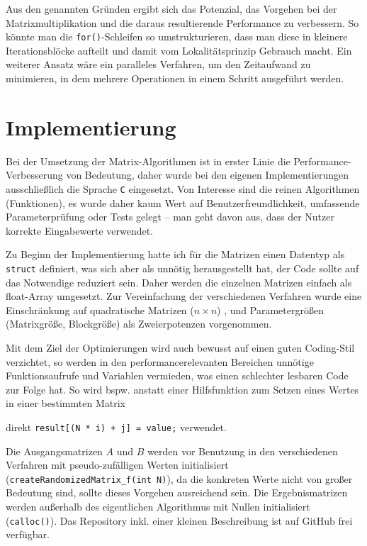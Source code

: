 \documentclass[a4paper,11pt]{scrartcl}
\newcommand{\bspw}{\mbox{bspw.}\xspace}
\newcommand{\inkl}{\mbox{inkl.}\xspace}
\begin{document}
Aus den genannten Gründen ergibt sich das Potenzial, das Vorgehen bei der Matrixmultiplikation
und die daraus resultierende Performance zu verbessern. So könnte man die \texttt{for()}-Schleifen so umstrukturieren, dass man diese in kleinere
Iterationsblöcke aufteilt und damit vom Lokalitätsprinzip Gebrauch macht. Ein weiterer Ansatz wäre
ein paralleles Verfahren, um den Zeitaufwand zu minimieren, in dem mehrere Operationen in einem
Schritt ausgeführt werden.

\section{Implementierung}
Bei der Umsetzung der Matrix-Algorithmen ist in erster Linie die Performance-Verbesserung 
von Bedeutung, daher wurde bei den eigenen Implementierungen ausschließlich die Sprache 
\texttt{C} eingesetzt. Von Interesse sind die reinen Algorithmen (Funktionen), es wurde daher
kaum Wert auf Benutzerfreundlichkeit, umfassende Parameterprüfung oder Tests gelegt --
man geht davon aus, dass der Nutzer korrekte Eingabewerte verwendet.\newline

Zu Beginn der Implementierung hatte ich für die Matrizen einen Datentyp als
\texttt{struct} definiert, was sich aber als unnötig herausgestellt hat, der
Code sollte auf das Notwendige reduziert sein. Daher werden die einzelnen 
Matrizen einfach als float-Array umgesetzt. Zur Vereinfachung der verschiedenen
Verfahren wurde eine Einschränkung auf quadratische Matrizen ($n \times n$) , 
und Parametergrößen (Matrixgröße, Blockgröße) als Zweierpotenzen vorgenommen.\newline

Mit dem Ziel der Optimierungen wird auch bewusst auf einen guten Coding-Stil verzichtet,
so werden in den performancerelevanten Bereichen unnötige Funktionsaufrufe und Variablen vermieden, was einen schlechter lesbaren Code zur Folge hat. So wird \bspw anstatt einer
Hilfsfunktion zum Setzen eines Wertes in einer bestimmten Matrix


direkt \texttt{result[(N * i) + j] = value;} verwendet.\newline

Die Ausgangsmatrizen $A$ und $B$
werden vor Benutzung in den verschiedenen Verfahren mit pseudo-zufälligen Werten initialisiert
(\texttt{createRandomizedMatrix\_f(int N)}), da die konkreten Werte nicht von großer Bedeutung sind, sollte dieses Vorgehen ausreichend sein. Die Ergebnismatrizen werden außerhalb des eigentlichen
Algorithmus mit Nullen initialisiert (\texttt{calloc()}). Das Repository \inkl einer kleinen
Beschreibung ist auf GitHub \cite{ghub} frei verfügbar.
\end{document}
